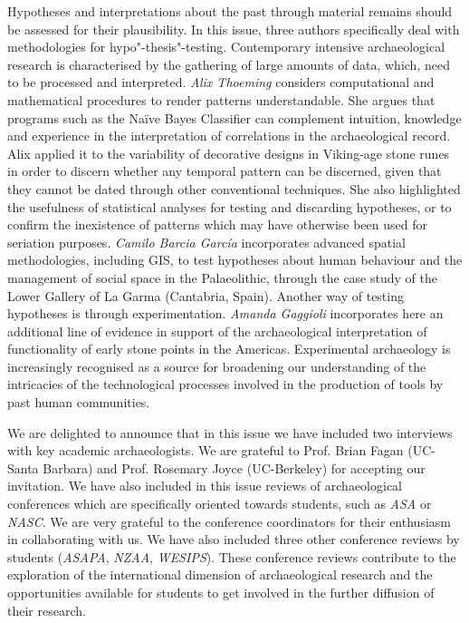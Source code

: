Hypotheses and interpretations about the past through material remains should be assessed for their plausibility. 
In this issue, three authors specifically deal with methodologies for hypo"-thesis"-testing. Contemporary intensive archaeological research is characterised by the gathering of large amounts of data, which, need to be processed and interpreted. \emph{Alix Thoeming} considers computational and mathematical procedures to render patterns understandable. She argues that programs such as the Naïve Bayes Classifier can complement intuition, knowledge and experience in the interpretation of correlations in the archaeological record. Alix applied it to the variability of decorative designs in Viking-age stone runes in order to discern whether any temporal pattern can be discerned, given that they cannot be dated through other conventional techniques. She also highlighted the usefulness of statistical analyses for testing and discarding hypotheses, or to confirm the inexistence of patterns which may have otherwise been used for seriation purposes. \emph{Camilo Barcia García} incorporates advanced spatial methodologies, including GIS, to test hypotheses about human behaviour and the management of social space in the Palaeolithic, through the case study of the Lower Gallery of La Garma (Cantabria, Spain). Another way of testing hypotheses is through experimentation. \emph{Amanda Gaggioli} incorporates here an additional line of evidence in support of the archaeological interpretation of functionality of early stone points in the Americas. Experimental archaeology is increasingly recognised as a source for broadening our understanding of the intricacies of the technological processes involved in the production of tools by past human communities.
		 
		 We are delighted to announce that in this issue we have included two interviews with key academic archaeologists. We are grateful to Prof. Brian Fagan (UC-Santa Barbara) and Prof. Rosemary Joyce (UC-Berkeley) for accepting our invitation. We have also included in this issue reviews of archaeological conferences which are specifically oriented towards students, such as \emph{ASA} or \emph{NASC}. We are very grateful to the conference coordinators for their enthusiasm in collaborating with us. We have also included three other conference reviews by students (\emph{ASAPA}, \emph{NZAA}, \emph{WESIPS}). These conference reviews contribute to the exploration of the international dimension of archaeological research and the opportunities available for students to get involved in the further diffusion of their research.
		 
